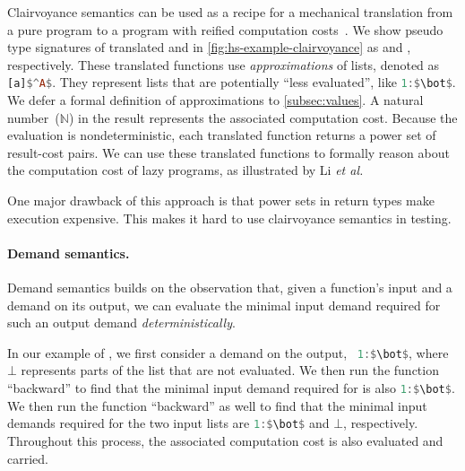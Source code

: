 Clairvoyance semantics can be used as a recipe for a mechanical translation from
a pure program to a program with reified computation costs~\cite{forking-paths}.
We show pseudo type signatures of translated  and \cdh{(++)} in
\cref{fig:hs-example-clairvoyance} as  and ,
respectively. These translated functions use \emph{approximations} of lists,
denoted as \lstinline[language=Haskell,breakatwhitespace,mathescape]{[a]$^A$}.
They represent lists that are potentially ``less evaluated'', like
\lstinline[language=Haskell,breakatwhitespace,mathescape]{1:$\bot$}. We defer a
formal definition of approximations to \cref{subsec:values}. A natural
number~($\mathbb{N}$) in the result represents the associated computation cost.
Because the evaluation is nondeterministic, each translated function returns a
power set of result-cost pairs. We can use these translated functions to
formally reason about the computation cost of lazy programs, as illustrated by
Li \textit{et al.}~\cite{forking-paths}

One major drawback of this approach is that power sets in return types make
execution expensive. This makes it hard to use clairvoyance semantics in
testing.

\paragraph{Demand semantics.} Demand semantics builds on the observation that,
given a function's input and a demand on its output, we can evaluate the minimal
input demand required for such an output demand \emph{deterministically}.

In our example of , we first consider a demand on
the output,
\eg~\lstinline[language=Haskell,breakatwhitespace,mathescape]{1:$\bot$}, where
$\bot$ represents parts of the list that are not evaluated. We then run the
 function ``backward'' to find that the minimal input demand required
for  is also
\lstinline[language=Haskell,breakatwhitespace,mathescape]{1:$\bot$}. We then run
the \cdh{(++)} function ``backward'' as well to find that the minimal input
demands required for the two input lists are
\lstinline[language=Haskell,breakatwhitespace,mathescape]{1:$\bot$} and $\bot$,
respectively. Throughout this process, the associated computation cost is also
evaluated and carried. 

